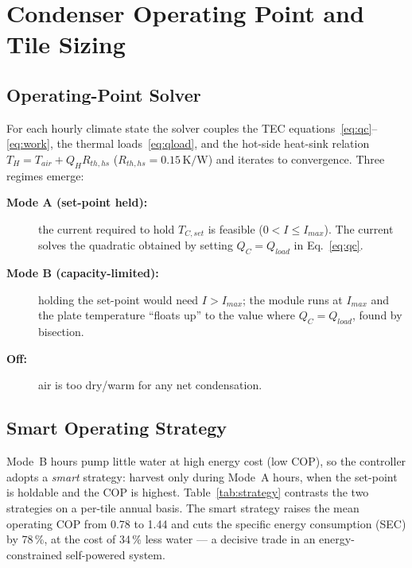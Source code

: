 \documentclass[12pt,a4paper]{report}
\newcommand{\num}[1]{#1}
\newcommand{\SI}[2]{#1\,\mbox{#2}}
\newcommand{\per}{/}
\newcommand{\kelvin}{K}
\newcommand{\percent}{\%}
\newcommand{\watt}{W}\newcommand{\Wh}{Wh}\newcommand{\kWh}{kWh}
\begin{document}
\chapter{Condenser Operating Point and Tile Sizing}
\label{ch:operating}

\section{Operating-Point Solver}
For each hourly climate state the solver couples the TEC
equations~\eqref{eq:qc}--\eqref{eq:work}, the thermal loads~\eqref{eq:qload}, and
the hot-side heat-sink relation $T_H=T_{air}+Q_H R_{th,hs}$
($R_{th,hs}=\SI{0.15}{\kelvin\per\watt}$) and iterates to convergence. Three
regimes emerge:
\begin{description}
  \item[\textnormal{\textbf{Mode A (set-point held):}}] the current required to
        hold $T_{C,set}$ is feasible ($0<I\le I_{max}$). The current solves the
        quadratic obtained by setting $Q_C=Q_{load}$ in Eq.~\eqref{eq:qc}.
  \item[\textnormal{\textbf{Mode B (capacity-limited):}}] holding the set-point
        would need $I>I_{max}$; the module runs at $I_{max}$ and the plate
        temperature ``floats up'' to the value where $Q_C=Q_{load}$, found by
        bisection.
  \item[\textnormal{\textbf{Off:}}] air is too dry/warm for any net condensation.
\end{description}

\section{Smart Operating Strategy}
Mode~B hours pump little water at high energy cost (low COP), so the controller
adopts a \emph{smart} strategy: harvest only during Mode~A hours, when the
set-point is holdable and the COP is highest. Table~\ref{tab:strategy} contrasts
the two strategies on a per-tile annual basis. The smart strategy raises the mean
operating COP from \num{0.78} to \num{1.44} and cuts the specific energy
consumption (SEC) by \SI{78}{\percent}, at the cost of \SI{34}{\percent} less
water --- a decisive trade in an energy-constrained self-powered system.
\end{document}
